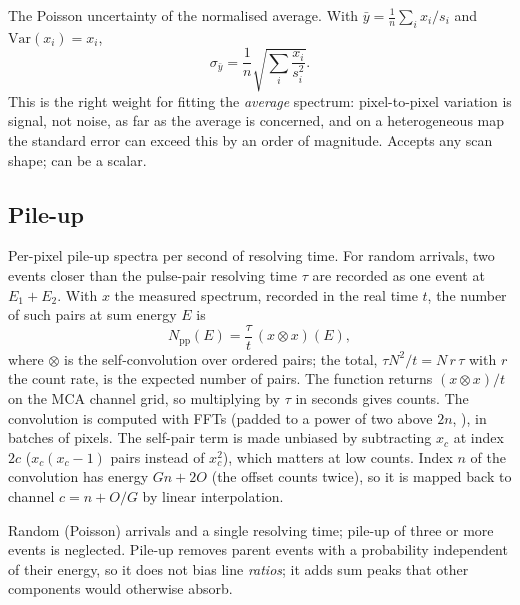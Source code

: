 The Poisson uncertainty of the normalised average. With $\bar y = \frac1n\sum_i x_i/s_i$ and
$\mathrm{Var}(x_i) = x_i$,
\begin{equation}
  \sigma_{\bar y} = \frac1n\sqrt{\sum_i \frac{x_i}{s_i^2}} .
\end{equation}
This is the right weight for fitting the \emph{average} spectrum: pixel-to-pixel variation is
signal, not noise, as far as the average is concerned, and on a heterogeneous map the
standard error can exceed this by an order of magnitude. Accepts any scan shape; 
can be a scalar.

\subsection{Pile-up}

Per-pixel pile-up spectra per second of resolving time. For random arrivals, two events
closer than the pulse-pair resolving time $\tau$ are recorded as one event at $E_1+E_2$. With
$x$ the measured spectrum, recorded in the real time $t$, the number of such pairs at sum
energy $E$ is \citep{Statham1977}
\begin{equation}
  N_\mathrm{pp}(E) = \frac{\tau}{t}\,(x\otimes x)(E),
\end{equation}
where $\otimes$ is the self-convolution over ordered pairs; the total, $\tau N^2/t =
N\,r\,\tau$ with $r$ the count rate, is the expected number of pairs. The function returns
$(x\otimes x)/t$ on the MCA channel grid, so multiplying by $\tau$ in seconds gives counts.
 The convolution is computed with FFTs (padded to a power of two above $2n$,
\citealp{Cooley1965}), in batches of  pixels. The self-pair term is made unbiased
by subtracting $x_c$ at index $2c$ ($x_c(x_c-1)$ pairs instead of $x_c^2$), which matters at
low counts. Index $n$ of the convolution has energy $Gn+2O$ (the offset counts twice), so it
is mapped back to channel $c = n + O/G$ by linear interpolation.
\begin{hyp}
Random (Poisson) arrivals and a single resolving time; pile-up of three or more events is
neglected. Pile-up removes parent events with a probability independent of their energy, so
it does not bias line \emph{ratios}; it adds sum peaks that other components would otherwise
absorb.
\end{hyp}

